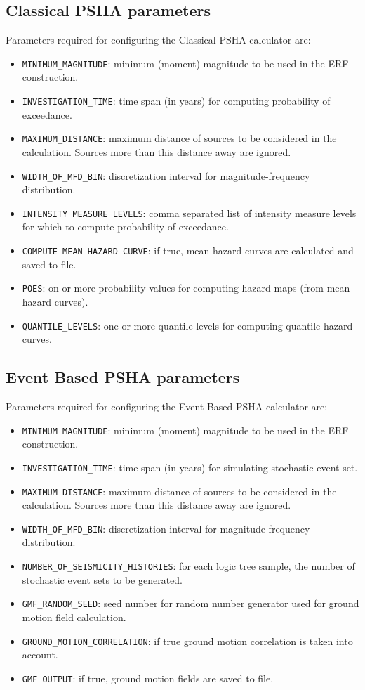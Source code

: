 \subsection{Classical PSHA parameters}
Parameters required for configuring the Classical PSHA calculator are:
\begin{itemize}
\item \Verb+MINIMUM_MAGNITUDE+: minimum (moment) magnitude to be used in the ERF construction.
\item \Verb+INVESTIGATION_TIME+: time span (in years) for computing probability of exceedance.
\item \Verb+MAXIMUM_DISTANCE+: maximum distance of sources to be considered in the calculation. Sources more than this distance away are ignored.
\item \Verb+WIDTH_OF_MFD_BIN+: discretization interval for  magnitude-frequency distribution.
\item \Verb+INTENSITY_MEASURE_LEVELS+: comma separated list of intensity measure levels for which to compute probability of exceedance.
\item \Verb+COMPUTE_MEAN_HAZARD_CURVE+: if true, mean hazard curves are calculated and saved to file.
\item \Verb+POES+: on or more probability values for computing hazard maps (from mean hazard curves).
\item \Verb+QUANTILE_LEVELS+: one or more quantile levels for computing quantile hazard curves.
\end{itemize}

\subsection{Event Based PSHA parameters}
Parameters required for configuring the Event Based PSHA calculator are:
\begin{itemize}
\item \Verb+MINIMUM_MAGNITUDE+: minimum (moment) magnitude to be used in the ERF construction.
\item \Verb+INVESTIGATION_TIME+: time span (in years) for simulating stochastic event set.
\item \Verb+MAXIMUM_DISTANCE+: maximum distance of sources to be considered in the calculation. Sources more than this distance away are ignored.
\item \Verb+WIDTH_OF_MFD_BIN+: discretization interval for  magnitude-frequency distribution.
\item \Verb+NUMBER_OF_SEISMICITY_HISTORIES+: for each logic tree sample, the number of stochastic event sets to be generated.
\item \Verb+GMF_RANDOM_SEED+: seed number for random number generator used for ground motion field calculation.
\item \Verb+GROUND_MOTION_CORRELATION+: if true ground motion correlation is taken into account.
\item \Verb+GMF_OUTPUT+: if true, ground motion fields are saved to file.
\end{itemize}

